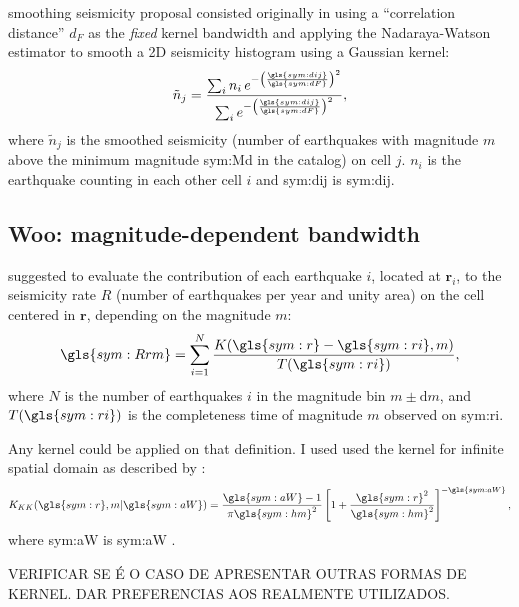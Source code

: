 \documentclass[grl]{agutex}
\begin{document}
\begin{article}
\citet{frankel_1995} smoothing seismicity proposal consisted originally in using a ``correlation distance'' $d_F$ as the \textit{fixed} kernel bandwidth and applying the Nadaraya-Watson \citep{nadaraya_1964, watson_1964} estimator to smooth a 2D seismicity histogram using a Gaussian kernel:
\begin{equation}
	\ensuremath{
		\tilde{n}_j = \frac{ \sum_{i} n_i \,e^{ - \left(\frac{\gls{sym:dij}}{\gls{sym:dF}}\right)^2}}
						   { \sum_{i}     e^{ - \left(\frac{\gls{sym:dij}}{\gls{sym:dF}}\right)^2}},
	}
	\label{eq:ni}
\end{equation}
where $\tilde{n}_j$ is the smoothed seismicity (number of earthquakes with magnitude $m$ above the minimum magnitude \gls{sym:Md} in the catalog) on cell $j$. $n_i$ is the earthquake counting in each other cell $i$ and \gls{sym:dij} is \glsdesc{sym:dij}.



\subsection{Woo: magnitude-dependent bandwidth}

\citet{woo_1996} suggested to evaluate the contribution of each earthquake $i$, located at $\boldsymbol{r}_i$, to the seismicity rate $R$ (number of earthquakes per year and unity area) on the cell centered in $\boldsymbol{r}$, depending on the magnitude $m$:
\begin{equation}
	\ensuremath{
		\gls{sym:Rrm} = \sum_{i=1}^{N} \frac{ K(\gls{sym:r} - \gls{sym:ri}, m)}
											{T({\gls{sym:ri})}},
	}
	\label{eq:Rrm}
\end{equation}
where $N$ is the number of earthquakes $i$ in the magnitude bin $m \pm \mathrm{d}m$,
and $T(\gls{sym:ri})$ is the completeness time of magnitude $m$ observed on \gls{sym:ri}.


Any kernel could be applied on that definition. I used used the \citet{kagan_knopoff_1980} kernel for infinite spatial domain as described by \citet{woo_1996}:
\begin{equation}
	\ensuremath{
		K_{KK}(\gls{sym:r}, m \arrowvert \gls{sym:aW}) =  \frac{  \gls{sym:aW}  -1}{\pi\gls{sym:hm}^2}
							\left[ 1 + \frac{\gls{sym:r}^2}{\gls{sym:hm}^2} \right]^{-\gls{sym:aW}},
	}
	\label{eq:k_kj}
\end{equation}
where \gls{sym:aW} is \glsdesc{sym:aW} \citep{verejones_1992}.


VERIFICAR SE É O CASO DE APRESENTAR OUTRAS FORMAS DE KERNEL. DAR PREFERENCIAS AOS REALMENTE UTILIZADOS.



\end{article}
\end{document}
